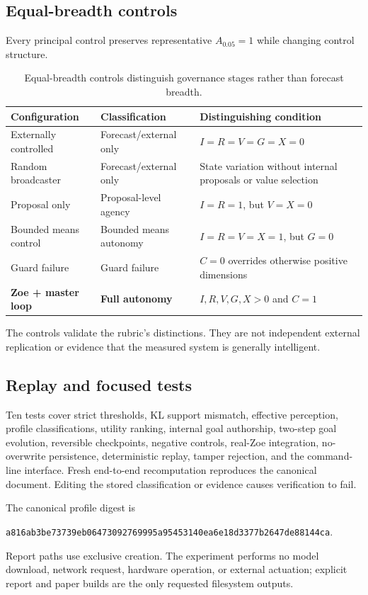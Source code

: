 \subsection{Equal-breadth controls}
Every principal control preserves representative $A_{0.05}=1$ while changing control structure.
\begin{table}[htbp]
\centering
\caption{Equal-breadth controls distinguish governance stages rather than forecast breadth.}
\label{tab:equal-breadth}
{\small
\begin{tabularx}{\textwidth}{p{3.4cm}p{4.0cm}X}
\toprule
Configuration&Classification&Distinguishing condition\\
\midrule
Externally controlled&Forecast/external only&$I=R=V=G=X=0$\\
Random broadcaster&Forecast/external only&State variation without internal proposals or value selection\\
Proposal only&Proposal-level agency&$I=R=1$, but $V=X=0$\\
Bounded means control&Bounded means autonomy&$I=R=V=X=1$, but $G=0$\\
Guard failure&Guard failure&$C=0$ overrides otherwise positive dimensions\\
\textbf{Zoe + master loop}&\textbf{Full autonomy}&$I,R,V,G,X>0$ and $C=1$\\
\bottomrule
\end{tabularx}}
\end{table}
The controls validate the rubric's distinctions. They are not independent external replication or evidence that the measured system is generally intelligent.

\subsection{Replay and focused tests}
Ten tests cover strict thresholds, KL support mismatch, effective perception, profile classifications, utility ranking, internal goal authorship, two-step goal evolution, reversible checkpoints, negative controls, real-Zoe integration, no-overwrite persistence, deterministic replay, tamper rejection, and the command-line interface. Fresh end-to-end recomputation reproduces the canonical document. Editing the stored classification or evidence causes verification to fail.

The canonical profile digest is
\begin{center}
\texttt{a816ab3be73739eb06473092769995a95453140ea6e18d3377b2647de88144ca}.
\end{center}
Report paths use exclusive creation. The experiment performs no model download, network request, hardware operation, or external actuation; explicit report and paper builds are the only requested filesystem outputs.

